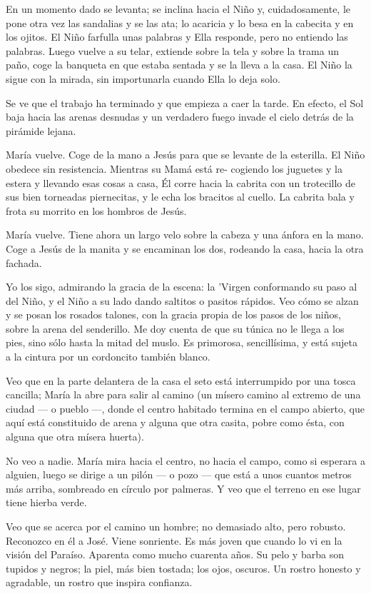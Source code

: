 \documentclass[12pt, twoside, openright]{book} %
\begin{document}
En un momento dado se levanta; se inclina hacia el Niño y, cuidadosamente, le pone otra vez las sandalias y se las ata; lo acaricia y lo besa en la cabecita y en los ojitos. El Niño farfulla unas palabras y Ella responde, pero no entiendo las palabras. Luego vuelve a su telar, extiende sobre la tela y sobre la trama un paño, coge la banqueta en que estaba sentada y se la lleva a la casa. El Niño la sigue con la mirada, sin importunarla cuando Ella lo deja solo. 

Se ve que el trabajo ha terminado y que empieza a caer la tarde. En efecto, el Sol baja hacia las arenas desnudas y un verdadero fuego invade el cielo detrás de la pirámide lejana. 

María vuelve. Coge de la mano a Jesús para que se levante de la esterilla. El Niño obedece sin resistencia. Mientras su Mamá está re- cogiendo los juguetes y la estera y llevando esas cosas a casa, Él corre hacia la cabrita con un trotecillo de sus bien torneadas piernecitas, y le echa los bracitos al cuello. La cabrita bala y frota su morrito en los hombros de Jesús. 

María vuelve. Tiene ahora un largo velo sobre la cabeza y una ánfora en la mano. Coge a Jesús de la manita y se encaminan los dos, rodeando la casa, hacia la otra fachada. 

Yo los sigo, admirando la gracia de la escena: la 'Virgen conformando su paso al del Niño, y el Niño a su lado dando saltitos o pasitos rápidos. Veo cómo se alzan y se posan los rosados talones, con la gracia propia de los pasos de los niños, sobre la arena del senderillo. Me doy cuenta de que su túnica no le llega a los pies, sino sólo hasta la mitad del muslo. Es primorosa, sencillísima, y está sujeta a la cintura por un cordoncito también blanco. 

Veo que en la parte delantera de la casa el seto está interrumpido por una tosca cancilla; María la abre para salir al camino (un mísero camino al extremo de una ciudad — o pueblo —, donde el centro habitado termina en el campo abierto, que aquí está constituido de arena y alguna que otra casita, pobre como ésta, con alguna que otra mísera huerta). 

No veo a nadie. María mira hacia el centro, no hacia el campo, como si esperara a alguien, luego se dirige a un pilón — o pozo — que está a unos cuantos metros más arriba, sombreado en círculo por palmeras. Y veo que el terreno en ese lugar tiene hierba verde. 

Veo que se acerca por el camino un hombre; no demasiado alto, pero robusto. Reconozco en él a José. Viene sonriente. Es más joven que cuando lo vi en la visión del Paraíso. Aparenta como mucho cuarenta años. Su pelo y barba son tupidos y negros; la piel, más bien tostada; los ojos, oscuros. Un rostro honesto y agradable, un rostro que inspira confianza. 
\end{document}
